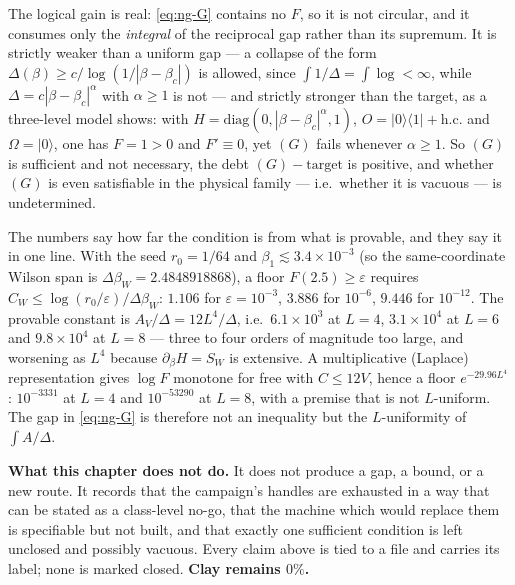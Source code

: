 The logical gain is real: \eqref{eq:ng-G} contains no $F$, so it is not circular, and it consumes only
the \emph{integral} of the reciprocal gap rather than its supremum. It is strictly weaker than a
uniform gap --- a collapse of the form $\Delta(\beta)\ge c/\log(1/|\beta-\beta_c|)$ is allowed, since
$\int1/\Delta=\int\log<\infty$, while $\Delta=c|\beta-\beta_c|^\alpha$ with $\alpha\ge1$ is not --- and
strictly stronger than the target, as a three-level model shows: with
$H=\mathrm{diag}(0,|\beta-\beta_c|^\alpha,1)$, $O=|0\rangle\langle1|+\mathrm{h.c.}$ and
$\Omega=|0\rangle$, one has $F=1>0$ and $F'\equiv0$, yet $(G)$ fails whenever $\alpha\ge1$. So $(G)$ is
sufficient and not necessary, the debt $(G)-\text{target}$ is positive, and whether $(G)$ is even
satisfiable in the physical family --- i.e.\ whether it is vacuous --- is undetermined.

The numbers say how far the condition is from what is provable, and they say it in one line. With the
seed $r_0=1/64$ and $\beta_1\lesssim3.4\times10^{-3}$ (so the same-coordinate Wilson span is
$\Delta\beta_W=2.4848918868$), a floor $F(2.5)\ge\varepsilon$ requires
$C_W\le\log(r_0/\varepsilon)/\Delta\beta_W$: $1.106$ for $\varepsilon=10^{-3}$, $3.886$ for
$10^{-6}$, $9.446$ for $10^{-12}$. The provable constant is
$A_V/\Delta=12L^4/\Delta$, i.e.\ $6.1\times10^3$ at $L=4$, $3.1\times10^4$ at $L=6$ and
$9.8\times10^4$ at $L=8$ --- three to four orders of magnitude too large, and worsening as $L^4$
because $\partial_\beta H=S_W$ is extensive. A multiplicative (Laplace) representation gives
$\log F$ monotone for free with $C\le12V$, hence a floor $e^{-29.96L^4}$: $10^{-3331}$ at $L=4$ and
$10^{-53290}$ at $L=8$, with a premise that is not $L$-uniform. The gap in \eqref{eq:ng-G} is therefore
not an inequality but the $L$-uniformity of $\int A/\Delta$.

\medskip
\noindent\textbf{What this chapter does not do.} It does not produce a gap, a bound, or a new route. It
records that the campaign's handles are exhausted in a way that can be stated as a class-level no-go,
that the machine which would replace them is specifiable but not built, and that exactly one
sufficient condition is left unclosed and possibly vacuous. Every claim above is tied to a file and
carries its label; none is marked closed. \textbf{Clay remains $0\%$.}

\let\code\codeprev
